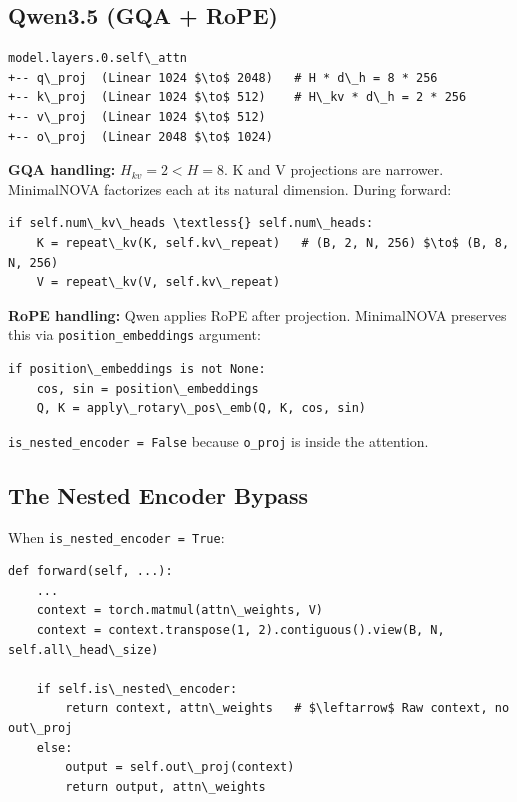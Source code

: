 \subsection{Qwen3.5 (GQA + RoPE)}

\begin{lstlisting}
model.layers.0.self\_attn
+-- q\_proj  (Linear 1024 $\to$ 2048)   # H * d\_h = 8 * 256
+-- k\_proj  (Linear 1024 $\to$ 512)    # H\_kv * d\_h = 2 * 256
+-- v\_proj  (Linear 1024 $\to$ 512)
+-- o\_proj  (Linear 2048 $\to$ 1024)
\end{lstlisting}

\textbf{GQA handling:} $H_{kv} = 2 < H = 8$. K and V projections are narrower. 
MinimalNOVA factorizes each at its natural dimension. During forward:

\begin{lstlisting}
if self.num\_kv\_heads \textless{} self.num\_heads:
    K = repeat\_kv(K, self.kv\_repeat)   # (B, 2, N, 256) $\to$ (B, 8, N, 256)
    V = repeat\_kv(V, self.kv\_repeat)
\end{lstlisting}

\textbf{RoPE handling:} Qwen applies RoPE after projection. MinimalNOVA preserves 
this via \texttt{position\_embeddings} argument:

\begin{lstlisting}
if position\_embeddings is not None:
    cos, sin = position\_embeddings
    Q, K = apply\_rotary\_pos\_emb(Q, K, cos, sin)
\end{lstlisting}

\texttt{is\_nested\_encoder = False} because \texttt{o\_proj} is inside the attention.

\subsection{The Nested Encoder Bypass}

When \texttt{is\_nested\_encoder = True}:

\begin{lstlisting}
def forward(self, ...):
    ...
    context = torch.matmul(attn\_weights, V)
    context = context.transpose(1, 2).contiguous().view(B, N, self.all\_head\_size)
    
    if self.is\_nested\_encoder:
        return context, attn\_weights   # $\leftarrow$ Raw context, no out\_proj
    else:
        output = self.out\_proj(context)
        return output, attn\_weights
\end{lstlisting}

